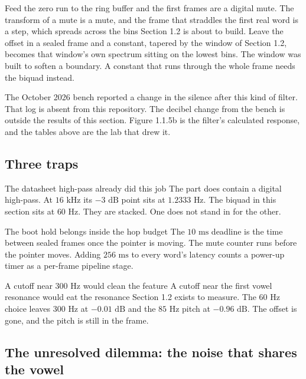 \documentclass[11pt,a4paper]{article}
\begin{document}
Feed the zero run to the ring buffer and the first frames are a digital mute. The transform of a mute is a mute, and the frame that straddles the first real word is a step, which spreads across the bins Section 1.2 is about to build. Leave the offset in a sealed frame and a constant, tapered by the window of Section 1.2, becomes that window's own spectrum sitting on the lowest bins. The window was built to soften a boundary. A constant that runs through the whole frame needs the biquad instead.

The October 2026 bench reported a change in the silence after this kind of filter. That log is absent from this repository. The decibel change from the bench is outside the results of this section. Figure 1.1.5b is the filter's calculated response, and the tables above are the lab that drew it.

\subsection*{Three traps}

\begin{misconceptionbox}{The datasheet high-pass already did this job}
The part does contain a digital high-pass. At $16\text{ kHz}$ its $-3\text{ dB}$ point sits at $1.2333\text{ Hz}$. The biquad in this section sits at $60\text{ Hz}$. They are stacked. One does not stand in for the other.
\end{misconceptionbox}

\begin{misconceptionbox}{The boot hold belongs inside the hop budget}
The $10\text{ ms}$ deadline is the time between sealed frames once the pointer is moving. The mute counter runs before the pointer moves. Adding $256\text{ ms}$ to every word's latency counts a power-up timer as a per-frame pipeline stage.
\end{misconceptionbox}

\begin{misconceptionbox}{A cutoff near $300\text{ Hz}$ would clean the feature}
A cutoff near the first vowel resonance would eat the resonance Section 1.2 exists to measure. The $60\text{ Hz}$ choice leaves $300\text{ Hz}$ at $-0.01\text{ dB}$ and the $85\text{ Hz}$ pitch at $-0.96\text{ dB}$. The offset is gone, and the pitch is still in the frame.
\end{misconceptionbox}

\subsection*{The unresolved dilemma: the noise that shares the vowel}
\end{document}
